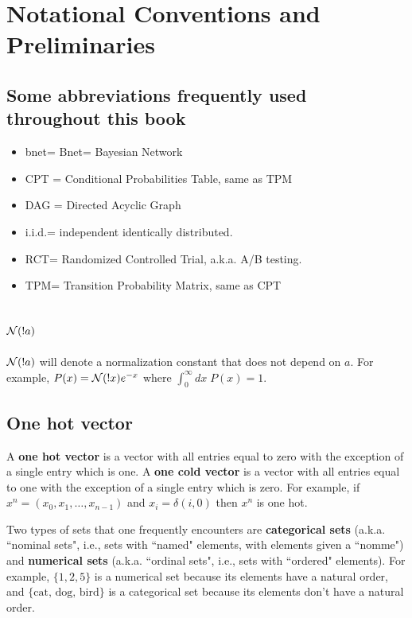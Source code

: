 

\chapter{Notational Conventions and Preliminaries}

\label{ch-conventions}
\section{Some abbreviations frequently
used throughout this book}

\begin{itemize}
\item
bnet= Bnet= Bayesian Network
\item
CPT = Conditional Probabilities Table,
 same as TPM
\item
DAG = Directed Acyclic Graph
\item
i.i.d.= independent identically
distributed.
 \item
 RCT= Randomized Controlled Trial,
a.k.a. A/B testing.

\item
TPM= Transition Probability Matrix,
same as CPT

\end{itemize}

\section{${\cal N}(!a)$}
${\cal N}(!a)$ will denote
a normalization constant that does not depend
on $a$. For example, $P(x)={\cal N}(!x)e^{-x}$
where $\int_0^\infty dx \;P(x)=1$.

\section{One hot vector}
A {\bf one hot  vector}
is a vector with all entries
equal to zero with
the exception of a single entry which is one.
A {\bf one cold vector}  is a vector with all entries
equal to one with the exception of  a
single entry which is zero.
For example, if $x^n=(x_0, x_1, \ldots,
x_{n-1})$ and
$x_i=\delta(i,0)$ then $x^n$ is one hot.

Two types of
sets that one frequently encounters
are {\bf categorical sets} (a.k.a. ``nominal sets", i.e.,
sets with ``named" elements, with elements given a ``nomme")
and {\bf numerical sets} (a.k.a. ``ordinal sets", i.e., sets
 with ``ordered"
elements).
For example, $\{1,2,5\}$ is a numerical set
because its elements have a natural order,
and $\{\text{cat, dog, bird}\}$ is a  categorical set
because its elements don't have a natural order.

